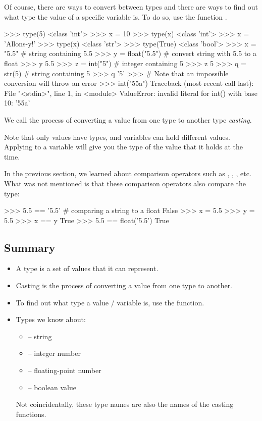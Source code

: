 \documentclass[11pt]{cselabheader}
\begin{document}
Of course, there are ways to convert between types and there are ways to find
out what type the value of a specific variable is. To do so, use the function
.
\begin{pyconcode}
>>> type(5)
<class 'int'>
>>> x = 10
>>> type(x)
<class 'int'>
>>> x = 'Allons-y!'
>>> type(x)
<class 'str'>
>>> type(True)
<class 'bool'>
>>> x = "5.5" # string containing 5.5
>>> y = float("5.5") # convert string with 5.5 to a float
>>> y
5.5
>>> z = int("5") # integer containing 5
>>> z
5
>>> q = str(5) # string containing 5
>>> q
'5'
>>> # Note that an impossible conversion will throw an error
>>> int("55a")
Traceback (most recent call last):
  File "<stdin>", line 1, in <module>
ValueError: invalid literal for int() with base 10: '55a'
\end{pyconcode}

We call the process of converting a value from one type to another type
\emph{casting}.

Note that only values have types, and variables can hold different values.
Applying  to a variable will give you the type of the value
that it holds at the time.

In the previous section, we learned about comparison operators
such as \pythoninline{!=}, \pythoninline{<}, \pythoninline{>}, etc. What was not
mentioned is that these comparison operators also compare the type:
\begin{pyconcode}
>>> 5.5 == '5.5' # comparing a string to a float
False
>>> x = 5.5
>>> y = 5.5
>>> x == y
True
>>> 5.5 == float('5.5')
True
\end{pyconcode}

\subsection{Summary}

\begin{itemize}
  \item A type is a set of values that it can represent.
  \item Casting is the process of converting a value from one type to another.
  \item To find out what type a value / variable is, use the
     function.
  \item Types we know about:
    \begin{multicols}{2}
      \begin{itemize}
        \item {} -- string
        \item {} -- integer number
        \item {} -- floating-point number
        \item {} -- boolean value
      \end{itemize}
    \end{multicols}
    Not coincidentally, these type names are also the names of the casting
    functions.
\end{itemize}
\end{document}
